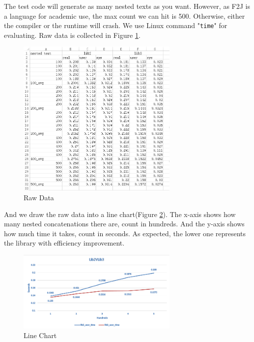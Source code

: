 The test code will generate as many nested texts as you want. However, as F2J is a language for academic use, the max count we can hit is 500. Otherwise, either the compiler or the runtime will crash. We use Linux command "\texttt{time}" for evaluating. Raw data is collected in Figure \ref{fig:efficiency comparation}.
\begin{figure}[h!]
    \centering
    \includegraphics[width=0.7\textwidth]{imgs/raw_data}
    \caption{Raw Data}
    \label{fig:efficiency comparation}
\end{figure}
And we draw the raw data into a line chart(Figure \ref{fig:efficiency line chart}). The x-axis shows how many nested concatenations there are, count in hundreds. And the y-axis shows how much time it takes, count in seconds. As expected, the lower one represents the library with efficiency improvement.
\begin{figure}[h!]
    \centering
    \includegraphics[width=0.7\textwidth]{imgs/compare}
    \caption{Line Chart}
    \label{fig:efficiency line chart}
\end{figure}


